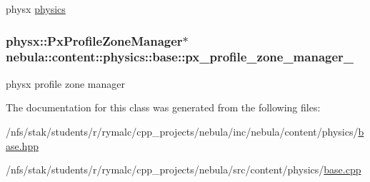 physx \hyperlink{namespacenebula_1_1content_1_1physics}{physics} \hypertarget{classnebula_1_1content_1_1physics_1_1base_a7e94c5f6e3573c17c4c1330a7726bcc6}{
\subsubsection[{px\_\-profile\_\-zone\_\-manager\_\-}]{\setlength{\rightskip}{0pt plus 5cm}physx::PxProfileZoneManager$\ast$ {\bf nebula::content::physics::base::px\_\-profile\_\-zone\_\-manager\_\-}}}
\label{classnebula_1_1content_1_1physics_1_1base_a7e94c5f6e3573c17c4c1330a7726bcc6}


physx profile zone manager 

The documentation for this class was generated from the following files:\begin{DoxyCompactItemize}
\item 
/nfs/stak/students/r/rymalc/cpp\_\-projects/nebula/inc/nebula/content/physics/\hyperlink{inc_2nebula_2content_2physics_2base_8hpp}{base.hpp}\item 
/nfs/stak/students/r/rymalc/cpp\_\-projects/nebula/src/content/physics/\hyperlink{src_2content_2physics_2base_8cpp}{base.cpp}\end{DoxyCompactItemize}
